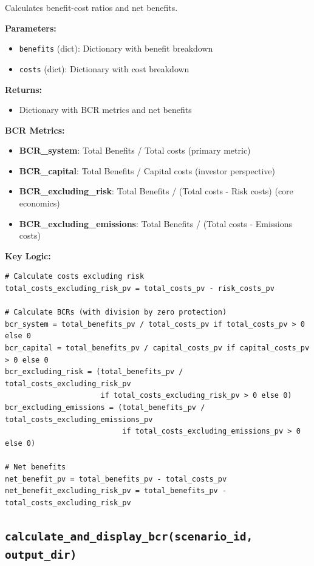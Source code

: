\documentclass[ctcc_full_documentation.tex]{subfiles}
\begin{document}
Calculates benefit-cost ratios and net benefits.

\textbf{Parameters:}
\begin{itemize}
    \item \texttt{benefits} (dict): Dictionary with benefit breakdown
    \item \texttt{costs} (dict): Dictionary with cost breakdown
\end{itemize}

\textbf{Returns:}
\begin{itemize}
    \item Dictionary with BCR metrics and net benefits
\end{itemize}

\textbf{BCR Metrics:}
\begin{itemize}
    \item \textbf{BCR\_system}: Total Benefits / Total costs (primary metric)
    \item \textbf{BCR\_capital}: Total Benefits / Capital costs (investor perspective)
    \item \textbf{BCR\_excluding\_risk}: Total Benefits / (Total costs - Risk costs) (core economics)
    \item \textbf{BCR\_excluding\_emissions}: Total Benefits / (Total costs - Emissions costs)
\end{itemize}

\textbf{Key Logic:}
\begin{lstlisting}
# Calculate costs excluding risk
total_costs_excluding_risk_pv = total_costs_pv - risk_costs_pv

# Calculate BCRs (with division by zero protection)
bcr_system = total_benefits_pv / total_costs_pv if total_costs_pv > 0 else 0
bcr_capital = total_benefits_pv / capital_costs_pv if capital_costs_pv > 0 else 0
bcr_excluding_risk = (total_benefits_pv / total_costs_excluding_risk_pv 
                      if total_costs_excluding_risk_pv > 0 else 0)
bcr_excluding_emissions = (total_benefits_pv / total_costs_excluding_emissions_pv 
                           if total_costs_excluding_emissions_pv > 0 else 0)

# Net benefits
net_benefit_pv = total_benefits_pv - total_costs_pv
net_benefit_excluding_risk_pv = total_benefits_pv - total_costs_excluding_risk_pv
\end{lstlisting}

\subsection{\texttt{calculate\_and\_display\_bcr(scenario\_id, output\_dir)}}
\end{document}
